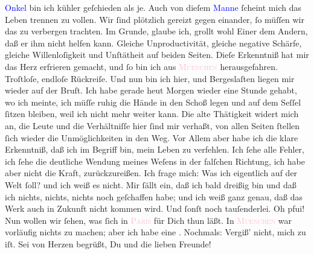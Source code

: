                   \textcolor{blue}{Onkel}{} bin ich kühler
               geſchieden als je. Auch von dieſem \textcolor{blue}{Manne}{} ſcheint mich das Leben trennen zu vollen. Wir ſind plötzlich gereizt
               gegen einander, ſo müſſen wir das zu verbergen trachten. Im Grunde, glaube ich,
               grollt wohl Einer dem Andern, daß er ihm nicht helfen kann. Gleiche Unproductivität,
               gleiche negative Schärfe, gleiche Willenloſigkeit und Unſtätheit auf beiden Seiten.
               Dieſe Erkenntniß hat mir das Herz erfrieren gemacht, und ſo bin ich aus \textsc{\textcolor{pink}{Muenchen}{}\ledrightnote{\textcolor{pink}{München}}} herausgefahren. Troſtloſe, endloſe Rückreiſe. {\pb}Und nun bin ich hier, und Bergeslaſten liegen mir wieder auf der Bruſt. Ich habe
               gerade heut{ }Morgen wieder eine Stunde gehabt, wo ich meinte, ich müſſe ruhig die
               Hände in den Schoß legen und auf dem Seſſel ſitzen bleiben, weil ich nicht mehr
               weiter kann. Die alte Thätigkeit widert mich an, die Leute und die Verhältniſſe hier
               ſind mir verhaßt, von allen Seiten ſtellen ſich wieder die Unmöglichkeiten in den
               Weg. Vor Allem  aber habe ich  die klare Erkenntniß, daß
               ich im Begriff bin, mein Leben zu verfehlen. Ich ſehe alle Fehler, ich ſehe die
               deutliche \strikeout{\textcolor{gray}{W}} Wendung meines Weſens in der falſchen Richtung, ich {\pb}habe aber nicht die Kraft, zurückzureißen. Ich frage
               mich: Was ich eigentlich auf der Welt ſoll? und ich weiß es nicht. Mir ſällt ein, daß
               ich bald dreißig bin und daß ich nichts, nichts, nichts noch geſchaffen habe; und ich
               weiß ganz genau, daß das Werk auch in Zukunft nicht kommen wird. Und ſonſt noch
               tauſenderlei. Oh pfui!{\dotsfive}\pend
           \pstart
           Nun wollen wir ſehen, was ſich in \textsc{\textcolor{pink}{Paris}{}\ledrightnote{\textcolor{pink}{Paris}}} für Dich thun läßt. In \textsc{\textcolor{pink}{Muenchen}{}\ledrightnote{\textcolor{pink}{München}}} war vorläufig nichts zu machen; aber ich habe eine \label{K_L02717-2v}\label{K_L02717-2h}. Nochmals: Vergiß’ nicht, mich  zu \label{K_L02717-3v}\label{K_L02717-3h} iſt. Sei von Herzen begrüßt, Du und die lieben Freunde!\pend
